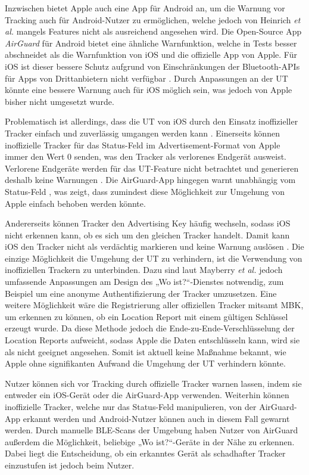 Inzwischen bietet Apple auch eine App für Android an, um die Warnung vor Tracking auch für Android-Nutzer zu ermöglichen, welche jedoch von Heinrich \textit{et al.} \cite{Heinrich_AirGuard} mangels Features nicht als ausreichend angesehen wird.
Die Open-Source App \textit{AirGuard} für Android bietet eine ähnliche Warnfunktion, welche in Tests besser abschneidet als die Warnfunktion von iOS und die offizielle App von Apple.
Für iOS ist dieser bessere Schutz aufgrund von Einschränkungen der Bluetooth-\acp{API} für Apps von Drittanbietern nicht verfügbar \cite{Heinrich_AirGuard}.
Durch Anpassungen an der \ac{UT} könnte eine bessere Warnung auch für iOS möglich sein, was jedoch von Apple bisher nicht umgesetzt wurde.

Problematisch ist allerdings, dass die \ac{UT} von iOS durch den Einsatz inoffizieller Tracker einfach und zuverlässig umgangen werden kann \cite{Heinrich_AirGuard,Mayberry_Tracking}.
Einerseits können inoffizielle Tracker für das Status-Feld im Advertisement-Format von Apple immer den Wert 0 senden, was den Tracker als verlorenes Endgerät ausweist.
Verlorene Endgeräte werden für das \ac{UT}-Feature nicht betrachtet und generieren deshalb keine Warnungen \cite{Heinrich_AirGuard,Mayberry_Tracking}.
Die AirGuard-App hingegen warnt unabhängig vom Status-Feld \cite{Heinrich_AirGuard}, was zeigt, dass zumindest diese Möglichkeit zur Umgehung von Apple einfach behoben werden könnte.

Andererseits können Tracker den Advertising Key häufig wechseln, sodass iOS nicht erkennen kann, ob es sich um den gleichen Tracker handelt.
Damit kann iOS den Tracker nicht als verdächtig markieren und keine Warnung auslösen \cite{Mayberry_Tracking}.
Die einzige Möglichkeit die Umgehung der \ac{UT} zu verhindern, ist die Verwendung von inoffiziellen Trackern zu unterbinden.
Dazu sind laut Mayberry \textit{et al.} \cite{Mayberry_Tracking} jedoch umfassende Anpassungen am Design des „Wo ist?“-Dienstes notwendig, zum Beispiel um eine anonyme Authentifizierung der Tracker umzusetzen.
Eine weitere Möglichkeit wäre die Registrierung aller offiziellen Tracker mitsamt \ac{MBK}, um erkennen zu können, ob ein Location Report mit einem gültigen Schlüssel erzeugt wurde.
Da diese Methode jedoch die Ende-zu-Ende-Verschlüsselung der Location Reports aufweicht, sodass Apple die Daten entschlüsseln kann, wird sie als nicht geeignet angesehen.
Somit ist aktuell keine Maßnahme bekannt, wie Apple ohne signifikanten Aufwand die Umgehung der \ac{UT} verhindern könnte.


Nutzer können sich vor Tracking durch offizielle Tracker warnen lassen, indem sie entweder ein iOS-Gerät oder die AirGuard-App verwenden.
Weiterhin können inoffizielle Tracker, welche nur das Status-Feld manipulieren, von der AirGuard-App erkannt werden und Android-Nutzer können auch in diesem Fall gewarnt werden.
Durch manuelle \ac{BLE}-Scans der Umgebung haben Nutzer von AirGuard außerdem die Möglichkeit, beliebige „Wo ist?“-Geräte in der Nähe zu erkennen.
Dabei liegt die Entscheidung, ob ein erkanntes Gerät als schadhafter Tracker einzustufen ist jedoch beim Nutzer.


